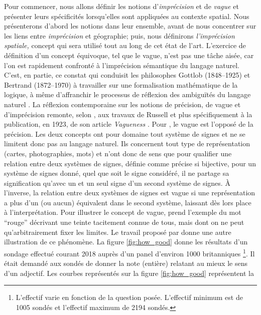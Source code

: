 Pour commencer, nous allons définir les notions d’\emph{imprécision}
et de \emph{vague} et présenter leurs spécificités lorsqu’elles sont
appliquées au contexte spatial. Nous présenterons d’abord les notions
dans leur ensemble, avant de nous concentrer sur les liens entre
\emph{imprécision} et géographie; puis, nous définirons\emph{
  l’imprécision spatiale,} concept qui sera utilisé tout au long de
cet état de l’art.  L’exercice de définition d’un concept équivoque,
tel que le vague, n’est pas une tâche aisée, car l’on est rapidement
confronté à l’imprécision sémantique du langage naturel. C’est, en
partie, ce constat qui conduisit les philosophes Gottlob 
(1848–1925) et Bertrand  (1872–1970) à travailler sur une
formalisation mathématique de la logique, à même d’affranchir le
processus de réflexion des ambiguïtés du langage naturel
\autocite{Williamson1994}. La réflexion contemporaine sur les notions
de précision, de vague et d’imprécision remonte, selon
\textcite{Williamson1994}, aux travaux de Russell et plus
spécifiquement à la publication, en 1923, de son article
\emph{Vagueness} \autocite{Russell1923}. Pour \textcite{Russell1923},
le vague est l’opposé de la précision. Les deux concepts ont pour
domaine tout système de signes et ne se limitent donc pas au langage
naturel. Ils concernent tout type de représentation (\eg cartes,
photographies, mots) et n’ont donc de sens que pour qualifier une
relation entre deux systèmes de signes, définie comme précise si
bijective, \ie pour un système de signes donné, quel que soit le signe
considéré, il ne partage sa signification qu’avec un et un seul signe
d’un second système de signes. À l’inverse, la relation entre deux
systèmes de signes est vague si une représentation a plus d’un (ou
aucun) équivalent dans le second système, laissant dès lors place à
l’interprétation. Pour illustrer le concept de vague, 
prend l’exemple du mot \enquote{rouge} décrivant une teinte tacitement
connue de tous, mais dont on ne peut qu’arbitrairement fixer les
limites. Le travail proposé par \textcite{Smith2018} donne une autre
illustration de ce phénomène. La figure \ref{fig:how_good} donne les
résultats d'un sondage effectué courant 2018 auprès d'un panel
d'environ 1000 britanniques \footnote{L'effectif varie en fonction de
  la question posée. L'effectif minimum est de 1005 sondés et
  l'effectif maximum de 2194 sondés.}. Il était demandé aux sondés de
donner la note (entière) relatant au mieux le sens d'un adjectif. Les
courbes représentés sur la figure \ref{fig:how_good} représentent la
